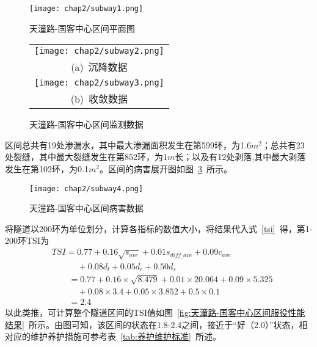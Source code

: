 \begin{figure}[htb!]
    \centering
    \texttt{[image: chap2/subway1.png]}
    \caption{天潼路-国客中心区间平面图}
    \label{fig:天潼路-国客中心区间平面图}
\end{figure}

\begin{figure}[htb!] 
    \centering 
    \begin{tabular}{c} 
        \texttt{[image: chap2/subway2.png]} \\ 
        (a)~沉降数据 \\
        \texttt{[image: chap2/subway3.png]} \\ 
        (b)~收敛数据 \\
    \end{tabular}
    \caption{天潼路-国客中心区间监测数据} 
    \label{fig:天潼路-国客中心区间监测数据} 
\end{figure}

区间总共有19处渗漏水，其中最大渗漏面积发生在第599环，为1.6$m^2$；总共有23处裂缝，其中最大裂缝发生在第852环，为1$m$长；以及有12处剥落,其中最大剥落发生在第102环，为0.1$m^2$。区间的病害展开图如图~\ref{fig:天潼路-国客中心区间病害数据}~所示。

\begin{figure}[htb!]
    \centering
    \texttt{[image: chap2/subway4.png]}
    \caption{天潼路-国客中心区间病害数据}
    \label{fig:天潼路-国客中心区间病害数据}
\end{figure}

将隧道以200环为单位划分，计算各指标的数值大小，将结果代入式~\ref{tsi}~得，第1-200环TSI为
\begin{align}
  & TSI=0.77+0.16\sqrt{{{s}_{ave}}}+0.01{{s}_{diff\_ave}}+0.09{{c}_{ave}} \nonumber \\ 
 & \quad \quad \quad +0.08{{d}_{l}}+0.05{{d}_{c}}+0.50{{d}_{s}} \nonumber \\ 
 & \quad \quad =0.77+0.16\times \sqrt{8.479}+0.01\times 20.064+0.09\times 5.325 \nonumber \\ 
 & \quad \quad \quad +0.08\times 3.4+0.05\times 3.852+0.5\times 0.1 \nonumber \\ 
 & \quad \quad =2.4 \nonumber
\end{align}
以此类推，可计算整个隧道区间的TSI值如图~\ref{fig:天潼路-国客中心区间服役性能结果}~所示。由图可知，该区间的状态在1.8-2.4之间，接近于“好（2.0）”状态，相对应的维护养护措施可参考表~\ref{tab:养护维护标准}~所述。

